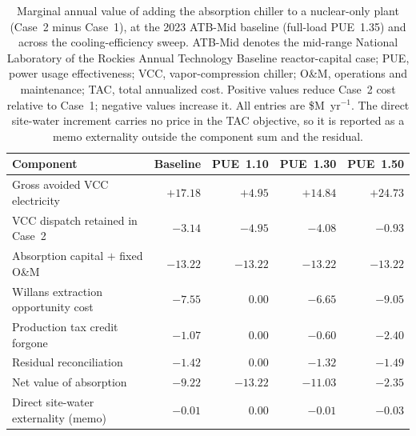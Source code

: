 \documentclass[sn-vancouver,Numbered]{sn-jnl}%
\newcommand{\sitablefont}{\tablebodyfont}
\begin{document}
\begin{table}[!ht]
\centering
\caption{Marginal annual value of adding the absorption chiller to a nuclear-only plant (Case~2 minus Case~1), at the 2023 ATB-Mid baseline (full-load PUE~1.35) and across the cooling-efficiency sweep. ATB-Mid denotes the mid-range National Laboratory of the Rockies Annual Technology Baseline reactor-capital case; PUE, power usage effectiveness; VCC, vapor-compression chiller; O\&M, operations and maintenance; TAC, total annualized cost. Positive values reduce Case~2 cost relative to Case~1; negative values increase it. All entries are \$M~yr$^{-1}$. The direct site-water increment carries no price in the TAC objective, so it is reported as a memo externality outside the component sum and the residual.}
\label{tab:value_decomp}
{\sitablefont
\begin{tabularx}{\linewidth}{@{}Y*{4}{R}@{}}
\toprule
Component & Baseline & PUE~1.10 & PUE~1.30 & PUE~1.50 \\
\midrule
Gross avoided VCC electricity        & $+17.18$ & $+4.95$  & $+14.84$ & $+24.73$ \\
VCC dispatch retained in Case~2      & $-3.14$  & $-4.95$  & $-4.08$  & $-0.93$ \\
Absorption capital $+$ fixed O\&M    & $-13.22$ & $-13.22$ & $-13.22$ & $-13.22$ \\
Willans extraction opportunity cost  & $-7.55$  & $0.00$   & $-6.65$  & $-9.05$ \\
Production tax credit forgone        & $-1.07$  & $0.00$   & $-0.60$  & $-2.40$ \\
Residual reconciliation              & $-1.42$  & $0.00$   & $-1.32$  & $-1.49$ \\
\midrule
Net value of absorption              & $-9.22$  & $-13.22$ & $-11.03$ & $-2.35$ \\
Direct site-water externality (memo) & $-0.01$  & $0.00$   & $-0.01$  & $-0.03$ \\
\bottomrule
\end{tabularx}
}
\end{table}
\end{document}
